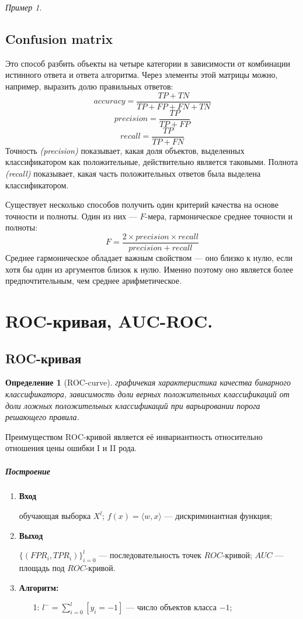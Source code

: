 \documentclass[a4paper, 12pt]{article}
\theoremstyle{plain} %
\newtheorem{definition}{Определение}
\theoremstyle{definition} %
\theoremstyle{remark} %
\newtheorem{example}{Пример}
\begin{document}
\begin{example}
\subsection{Confusion matrix}

Это способ разбить объекты на четыре категории в зависимости от комбинации истинного ответа и ответа алгоритма. Через элементы этой матрицы можно, например, выразить долю правильных ответов:
\[
	accuracy = \frac{TP+TN}{TP+FP+FN+TN}
\]
\[
	precision = \frac{TP}{TP+FP}
\]
\[
	recall = \frac{TP}{TP+FN}
\]
Точность \emph{(precision)} показывает, какая доля объектов, выделенных классификатором как положительные, действительно является таковыми. Полнота \emph{(recall)} показывает, какая часть положительных ответов была выделена классификатором.

Существует несколько способов получить один критерий качества на основе точности и полноты. Один из них --- $F$-мера, гармоническое среднее точности и полноты:
\[
	F = \frac{2\times precision \times recall}{precision+recall}
\]
Среднее гармоническое обладает важным свойством --- оно близко к нулю, если хотя бы один из аргументов близок к нулю. Именно поэтому оно является более предпочтительным, чем среднее арифметическое.

\section{ROC-кривая, AUC-ROC.}

\subsection{ROC-кривая}

\begin{definition}[ROC-curve]
	графичекая характеристика качества бинарного классификатора, зависимость доли верных положительных классификаций от доли ложных положительных классификаций при варьировании порога решающего правила.
\end{definition}
	Преимуществом ROC-кривой является её инвариантность относительно отношения цены ошибки I и II рода.

\subparagraph{Построение}
	\begin{enumerate}
		\item \textbf{Вход}

			обучающая выборка $X^{l}$; $f(x) = \langle w,x \rangle$ --- дискриминантная функция;
		\item \textbf{Выход}

			$\{ (FPR_{i}, TPR_{i})\}_{i=0}^{l}$ --- последовательность точек $ROC$-кривой;
			$AUC$ --- площадь под $ROC$-кривой.
		\item \textbf{Алгоритм:}
		\begin{enumerate}
			\item[1:] $l^{-} = \sum^{l}_{i=0}[y_{i}=-1]$ --- число объектов класса $-1$;


\end{enumerate}
\end{enumerate}
\end{example}
\end{document}
